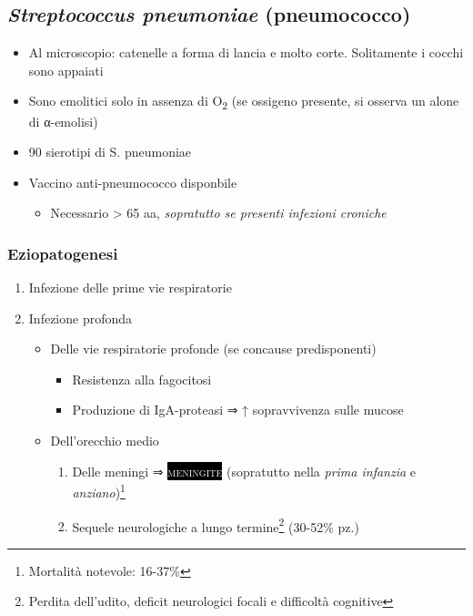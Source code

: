 \documentclass[italian,]{article}
\providecommand{\tightlist}{%
  \setlength{\itemsep}{0pt}\setlength{\parskip}{0pt}}
\newcommand{\pat}[1]{\colorbox{black}{\textcolor{white}{\textsc{#1}}}}
\begin{document}
\hypertarget{streptococcus-pneumoniae-pneumococco}{%
\subsection{\texorpdfstring{\emph{Streptococcus pneumoniae}
(pneumococco)}{Streptococcus pneumoniae (pneumococco)}}\label{streptococcus-pneumoniae-pneumococco}}

\begin{itemize}
\tightlist
\item
  Al microscopio: catenelle a forma di lancia e molto corte. Solitamente
  i cocchi sono appaiati
\item
  Sono emolitici solo in assenza di O\textsubscript{2} (se ossigeno
  presente, si osserva un alone di α-emolisi)
\item
  90 sierotipi di S. pneumoniae
\item
  Vaccino anti-pneumococco disponbile

  \begin{itemize}
  \tightlist
  \item
    Necessario \textgreater{} 65 aa, \emph{sopratutto se presenti
    infezioni croniche}
  \end{itemize}
\end{itemize}

\hypertarget{eziopatogenesi}{%
\subsubsection{Eziopatogenesi}\label{eziopatogenesi}}

\begin{enumerate}
\def\labelenumi{\arabic{enumi}.}
\setcounter{enumi}{-1}
\tightlist
\item
  Infezione delle prime vie respiratorie
\item
  Infezione profonda

  \begin{itemize}
  \tightlist
  \item
    Delle vie respiratorie profonde (se concause predisponenti)

    \begin{itemize}
    \tightlist
    \item
      Resistenza alla fagocitosi
    \item
      Produzione di IgA-proteasi ⇒ ↑ sopravvivenza sulle mucose
    \end{itemize}
  \item
    Dell'orecchio medio

    \begin{enumerate}
    \def\labelenumii{\arabic{enumii}.}
    \setcounter{enumii}{1}
    \tightlist
    \item
      Delle meningi ⇒ \pat{meningite} (sopratutto nella \emph{prima
      infanzia} e \emph{anziano})\footnote{Mortalità notevole: 16-37\%}
    \item
      Sequele neurologiche a lungo termine\footnote{Perdita dell'udito,
        deficit neurologici focali e difficoltà cognitive} (30-52\% pz.)
    \end{enumerate}
  \end{itemize}
\end{enumerate}
\end{document}
